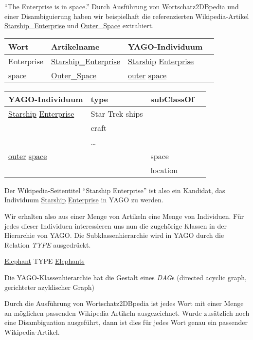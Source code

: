\begin{bsp}
"`The Enterprise is in space."'
Durch Ausführung von Wortschatz2DBpedia und einer Disambiguierung haben wir beispielhaft die referenzierten Wikipedia-Artikel \url{Starship_Enterprise} und \url{Outer_Space} extrahiert.
\begin{center}
\begin{tabular}{llll}
Wort		&Artikelname			&YAGO-Individuum\\
\hline
Enterprise	&\url{Starship_Enterprise}	&\url{Starship} \url{Enterprise}\\
space		&\url{Outer_Space}		&\url{outer} \url{space}\\
\end{tabular}

\begin{tabular}{llll}
YAGO-Individuum			&type			&subClassOf\\
\hline
\url{Starship} \url{Enterprise}	&Star Trek ships	&~\\
~				&craft			&~\\
~				&\ldots			&~\\
\url{outer} \url{space}		&~			&space\\
~				&~			&location\\
\end{tabular}
\end{center}


\end{bsp}



Der Wikipedia-Seitentitel "`Starship Enterprise"' ist also ein Kandidat, das Individuum \url{Starship} \url{Enterprise} in YAGO zu werden.


Wir erhalten also aus einer Menge von Artikeln eine Menge von Individuen.
Für jedes dieser Individuen interessieren uns nun die zugehörige Klassen in der Hierarchie von YAGO.
Die Subklassenhierarchie wird in YAGO durch die Relation \textit{TYPE} ausgedrückt.

\url{Elephant} TYPE \url{Elephants}

Die YAGO-Klassenhierarchie hat die Gestalt eines \textit{DAG}s (directed acyclic graph, gerichteter azyklischer Graph)


Durch die Ausführung von Wortschatz2DBpedia ist jedes Wort mit einer Menge an möglichen passenden Wikipedia-Artikeln ausgezeichnet. Wurde zusätzlich noch eine Disambiguation ausgeführt, dann ist dies für 
jedes Wort genau ein passender Wikipedia-Artikel.



